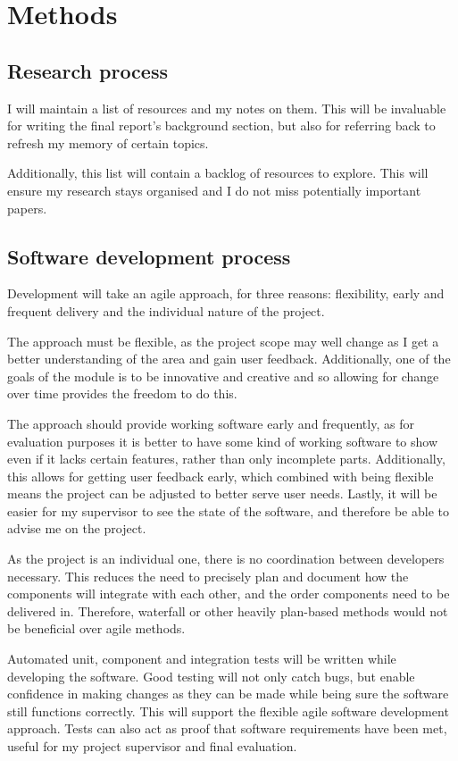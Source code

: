 \documentclass[12pt]{article}
\begin{document}
\section{Methods}

\subsection{Research process}

I will maintain a list of resources and my notes on them. This will be invaluable for writing the final report’s background section, but also for referring back to refresh my memory of certain topics.

Additionally, this list will contain a backlog of resources to explore. This will ensure my research stays organised and I do not miss potentially important papers.

\subsection{Software development process}

Development will take an agile approach, for three reasons: flexibility, early and frequent delivery and the individual nature of the project.

The approach must be flexible, as the project scope may well change as I get a better understanding of the area and gain user feedback. Additionally, one of the goals of the module is to be innovative and creative\cite{ref8} and so allowing for change over time provides the freedom to do this.

The approach should provide working software early and frequently, as for evaluation purposes it is better to have some kind of working software to show even if it lacks certain features, rather than only incomplete parts. Additionally, this allows for getting user feedback early, which combined with being flexible means the project can be adjusted to better serve user needs. Lastly, it will be easier for my supervisor to see the state of the software, and therefore be able to advise me on the project.

As the project is an individual one, there is no coordination between developers necessary. This reduces the need to precisely plan and document how the components will integrate with each other, and the order components need to be delivered in. Therefore, waterfall or other heavily plan-based methods would not be beneficial over agile methods.

Automated unit, component and integration tests will be written while developing the software. Good testing will not only catch bugs, but enable confidence in making changes as they can be made while being sure the software still functions correctly. This will support the flexible agile software development approach. Tests can also act as proof that software requirements have been met, useful for my project supervisor and final evaluation.
\end{document}
